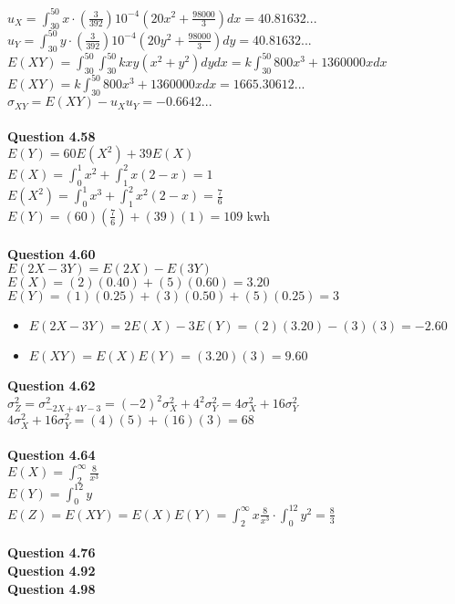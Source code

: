 \documentclass{article}
\begin{document}
        $u_X = \int_{30}^{50}x\cdot (\frac{3}{392})10^{-4}(20x^2+\frac{98000}{3})dx = 40.81632...$\\
        $u_Y = \int_{30}^{50}y\cdot (\frac{3}{392})10^{-4}(20y^2+\frac{98000}{3})dy = 40.81632...$\\
        $E(XY) = \int_{30}^{50}\int_{30}^{50}kxy(x^2+y^2)dydx = k\int_{30}^{50}800x^3+1360000xdx$\\
        $E(XY) = k\int_{30}^{50}800x^3+1360000xdx = 1665.30612...$\\
        $\sigma_{XY} = E(XY) - u_Xu_Y = -0.6642...$
        \\\\
    \textbf{Question 4.58}\\
        $E(Y) = 60E(X^2) + 39E(X)$\\
        $E(X) = \int_0^1x^2 + \int_1^2x(2-x) = 1$\\
        $E(X^2) = \int_0^1x^3 + \int_1^2x^2(2-x) = \frac{7}{6}$\\
        $E(Y) = (60)(\frac{7}{6}) + (39)(1) = 109$ kwh
        \\\\
    \textbf{Question 4.60}\\
        $E(2X-3Y) = E(2X) - E(3Y)$\\
        $E(X) = (2)(0.40) + (5)(0.60) = 3.20$\\
        $E(Y) = (1)(0.25) + (3)(0.50) + (5)(0.25) = 3$
        \begin{itemize}
            \item $E(2X-3Y) = 2E(X) - 3E(Y) = (2)(3.20)-(3)(3) = -2.60$
            \item $E(XY) = E(X)E(Y) = (3.20)(3) = 9.60$
        \end{itemize}
    \textbf{Question 4.62}\\
        $\sigma_Z^2 = \sigma_{-2X+4Y-3}^2 = (-2)^2\sigma_X^2 + 4^2\sigma_Y^2 = 4\sigma_X^2 + 16\sigma_Y^2$\\
        $4\sigma_X^2 + 16\sigma_Y^2 = (4)(5) + (16)(3) = 68$
    \\\\
    \textbf{Question 4.64}\\
        $E(X) = \int_2^{\infty}\frac{8}{x^3}$\\
        $E(Y) = \int_0^12y$\\
        $E(Z) = E(XY) = E(X)E(Y) = \int_2^{\infty}x\frac{8}{x^3} \cdot \int_0^12y^2 = \frac{8}{3}$
        \\\\
    \textbf{Question 4.76}\\
    \textbf{Question 4.92}\\
    \textbf{Question 4.98}\\
\end{document}
